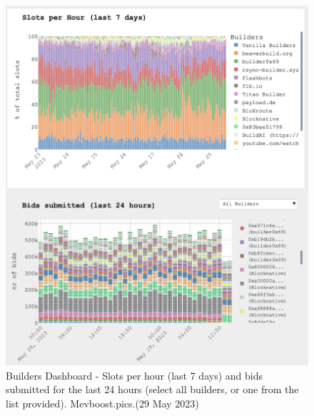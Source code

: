 \documentclass[UTF8]{article}
\begin{document}
{\begin{figure}[htbp]
\begin{center}
\includegraphics[width=0.9\linewidth]{images/mevbuilder2}
\caption{Builders Dashboard - Slots per hour (last 7 days) and bids submitted  for the last 24 hours (select all builders, or one from the list provided). Mevboost.pics.(29 May 2023)}
\label{fig:mevbuilder2}
\end{center}
\end{figure}

}
\end{document}
